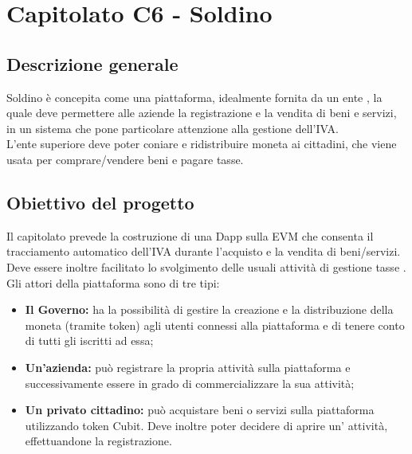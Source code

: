 \section{Capitolato C6 - Soldino}\label{section:c6}

\subsection{Descrizione generale}
Soldino è concepita come una piattaforma, idealmente fornita da un ente , la quale deve permettere alle aziende la registrazione e la vendita di beni e servizi, in un sistema che pone particolare attenzione alla gestione dell’IVA. \\
L’ente superiore deve poter coniare e ridistribuire moneta ai cittadini, che viene usata per comprare/vendere beni e pagare tasse.

\subsection{Obiettivo del progetto}
Il capitolato prevede la costruzione di una Dapp sulla EVM che consenta il tracciamento automatico dell’IVA durante l’acquisto e la vendita di beni/servizi. Deve essere inoltre facilitato lo svolgimento delle usuali attività di gestione tasse .\\
Gli attori della piattaforma sono di tre tipi:
\begin{itemize}
	\item \textbf{Il Governo:} ha la possibilità di gestire la creazione e la distribuzione della moneta (tramite token) agli utenti connessi alla piattaforma e di tenere conto di tutti gli iscritti ad essa;
	\item\textbf{ Un’azienda:} può registrare la propria attività sulla piattaforma e successivamente essere in grado di commercializzare la sua attività;
	\item \textbf{Un privato cittadino:} può acquistare beni o servizi sulla piattaforma utilizzando token Cubit. Deve inoltre poter decidere di aprire un’ attività, effettuandone la registrazione.
\end{itemize}

